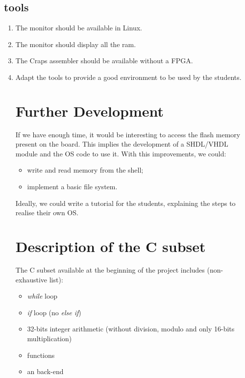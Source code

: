 \documentclass{article}
\begin{document}
      \subsection{tools}
        \begin{enumerate}
          \item The monitor should be available in Linux.
          \item The monitor should display all the ram.
          \item The Craps assembler should be available without a FPGA.
          \item Adapt the tools to provide a good environment to be used by the
            students.

    \section{Further Development}
      If we have enough time, it would be interesting to access the flash memory
      present on the board. This implies the development of a SHDL/VHDL module
      and the OS code to use it. With this improvements, we could:
      \begin{itemize}
        \item write and read memory from the shell;
        \item implement a basic file system.
      \end{itemize}
      Ideally, we could write a tutorial for the students, explaining the steps
      to realise their own OS.

  \newpage

  \begin{appendix}
    \section{Description of the C subset}\label{app:C89}
      The C subset available at the beginning of the project includes
      (non-exhaustive list):
      \begin{itemize}
        \item \textit{while} loop
        \item \textit{if} loop (no \textit{else if})
        \item 32-bits integer arithmetic (without division, modulo and only
          16-bits multiplication)
        \item functions
        \item an  back-end
      \end{itemize}


\end{appendix}
\end{enumerate}
\end{document}
